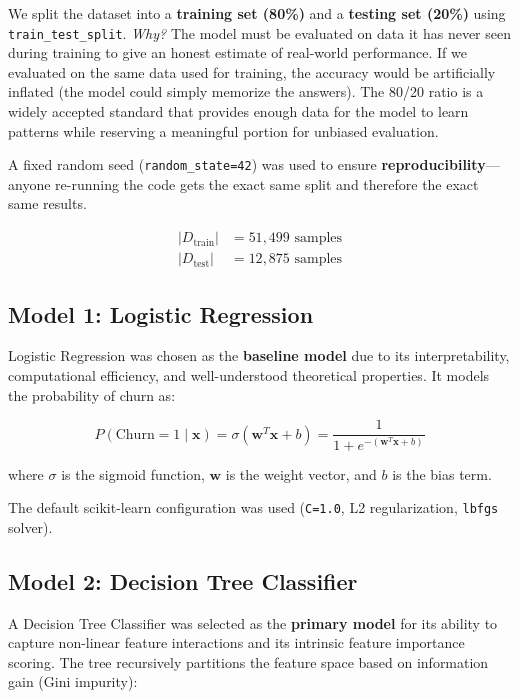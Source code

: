 \documentclass[12pt, a4paper]{article}
\begin{document}
We split the dataset into a \textbf{training set (80\%)} and a \textbf{testing set (20\%)} using \texttt{train\_test\_split}. \textit{Why?} The model must be evaluated on data it has never seen during training to give an honest estimate of real-world performance. If we evaluated on the same data used for training, the accuracy would be artificially inflated (the model could simply memorize the answers). The 80/20 ratio is a widely accepted standard that provides enough data for the model to learn patterns while reserving a meaningful portion for unbiased evaluation.

A fixed random seed (\texttt{random\_state=42}) was used to ensure \textbf{reproducibility}---anyone re-running the code gets the exact same split and therefore the exact same results.

\begin{align}
    |D_{\text{train}}| &= 51{,}499 \text{ samples} \\
    |D_{\text{test}}|  &= 12{,}875 \text{ samples}
\end{align}

\subsection{Model 1: Logistic Regression}

Logistic Regression was chosen as the \textbf{baseline model} due to its interpretability, computational efficiency, and well-understood theoretical properties. It models the probability of churn as:

\begin{equation}
    P(\text{Churn} = 1 \mid \mathbf{x}) = \sigma(\mathbf{w}^T \mathbf{x} + b) = \frac{1}{1 + e^{-(\mathbf{w}^T \mathbf{x} + b)}}
\end{equation}

where $\sigma$ is the sigmoid function, $\mathbf{w}$ is the weight vector, and $b$ is the bias term.

The default scikit-learn configuration was used (\texttt{C=1.0}, L2 regularization, \texttt{lbfgs} solver).

\subsection{Model 2: Decision Tree Classifier}

A Decision Tree Classifier was selected as the \textbf{primary model} for its ability to capture non-linear feature interactions and its intrinsic feature importance scoring. The tree recursively partitions the feature space based on information gain (Gini impurity):
\end{document}
